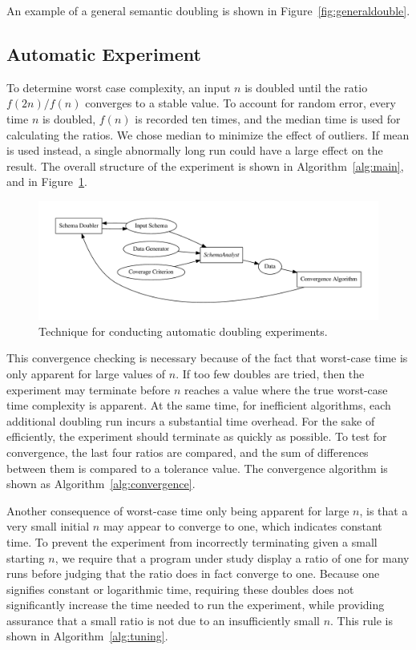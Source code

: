   An example of a general semantic doubling is shown in
  Figure~\ref{fig:generaldouble}.

  \subsection{Automatic Experiment}
  \label{subsec:experiment}

  To determine worst case complexity, an input $n$ is doubled until the 
  ratio $f(2n) / f(n)$ converges to a stable value. To account for random
  error, every time $n$ is doubled, $f(n)$ is recorded ten times, and the
  median time is used for calculating the ratios.  We chose
  median to minimize the effect of outliers. If mean is used instead, a
  single abnormally long run could have a large effect on the result. The overall 
  structure of the experiment is shown in Algorithm~\ref{alg:main}, and in
  Figure~\ref{fig:doublingexp}.

  \begin{figure}
    \centering
    \centering
    \includegraphics[width=.5\linewidth]{../diagrams/doublingexp.pdf}
    \caption{Technique for conducting automatic doubling experiments.}
    \label{fig:doublingexp}
  \end{figure}


  This convergence checking is necessary because of the fact that worst-case
  time is only apparent for large values of $n$. If too few doubles
  are tried, then the experiment may terminate before $n$ reaches a value
  where the true worst-case time complexity is apparent. At the same time,
  for inefficient  algorithms, each additional doubling run incurs a substantial
  time overhead. For the sake of efficiently, the experiment should
  terminate as quickly as possible.
  To test for convergence, the last four ratios are compared, and the
  sum of differences between them is compared to a tolerance value. The
  convergence algorithm is shown as Algorithm~\ref{alg:convergence}.

  Another consequence of worst-case time only being apparent for large
  $n$, is that a very small initial $n$ may appear to converge to one,
  which indicates constant time. To prevent the
  experiment from incorrectly terminating given a small starting $n$, we
  require that a program under study display a ratio of one for many
  runs before judging that the ratio does in fact converge to one. Because 
  one signifies constant or logarithmic 
  time, requiring these doubles does not significantly increase the time needed
  to run the experiment, while providing assurance that a small ratio is not due
  to an insufficiently small $n$. This rule is shown in 
  Algorithm~\ref{alg:tuning}.

